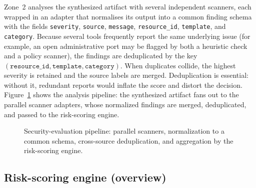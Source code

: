 Zone~2 analyses the synthesized artifact with several independent scanners, each wrapped
in an adapter that normalises its output into a common finding schema with the fields
\texttt{severity}, \texttt{source}, \texttt{message}, \texttt{resource\_id},
\texttt{template}, and \texttt{category}. Because several tools frequently report the
same underlying issue (for example, an open administrative port may be flagged by both a
heuristic check and a policy scanner), the findings are deduplicated by the key
$(\texttt{resource\_id}, \texttt{template}, \texttt{category})$. When duplicates collide,
the highest severity is retained and the source labels are merged. Deduplication is
essential: without it, redundant reports would inflate the score and distort the
decision. Figure~\ref{fig:method-gate} shows the analysis pipeline: the synthesized
artifact fans out to the parallel scanner adapters, whose normalized findings are merged,
deduplicated, and passed to the risk-scoring engine.

\begin{figure}[ht]
\centering
{}
\caption{Security-evaluation pipeline: parallel scanners, normalization to a common
schema, cross-source deduplication, and aggregation by the risk-scoring engine.}
\label{fig:method-gate}
\end{figure}

\subsection{Risk-scoring engine (overview)}
\label{subsec:method-scoring}

